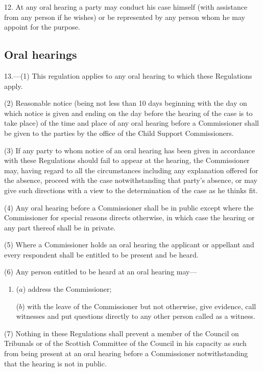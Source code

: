 \documentclass[12pt,a4paper]{article}
\begin{document}
12.  At any oral hearing a party may conduct his case himself (with assistance from any person if he wishes) or be represented by any person whom he may appoint for the purpose.

\subsection[13. Oral hearings]{Oral hearings}

13.—(1) This regulation applies to any oral hearing to which these Regulations apply.

(2) Reasonable notice (being not less than 10 days beginning with the day on which notice is given and ending on the day before the hearing of the case is to take place) of the time and place of any oral hearing before a Commissioner shall be given to the parties by the office of the Child Support Commissioners.

(3) If any party to whom notice of an oral hearing has been given in accordance with these Regulations should fail to appear at the hearing, the Commissioner may, having regard to all the circumstances including any explanation offered for the absence, proceed with the case notwithstanding that party’s absence, or may give such directions with a view to the determination of the case as he thinks fit.

(4) Any oral hearing before a Commissioner shall be in public except where the Commissioner for special reasons directs otherwise, in which case the hearing or any part thereof shall be in private.

(5) Where a Commissioner holds an oral hearing the applicant or appellant and every respondent shall be entitled to be present and be heard.

(6) Any person entitled to be heard at an oral hearing may—
\begin{enumerate}\item[]
($a$) address the Commissioner;

($b$) with the leave of the Commissioner but not otherwise, give evidence, call witnesses and put questions directly to any other person called as a witness.
\end{enumerate}

(7) Nothing in these Regulations shall prevent a member of the Council on Tribunals or of the Scottish Committee of the Council in his capacity as such from being present at an oral hearing before a Commissioner notwithstanding that the hearing is not in public.
\end{document}
